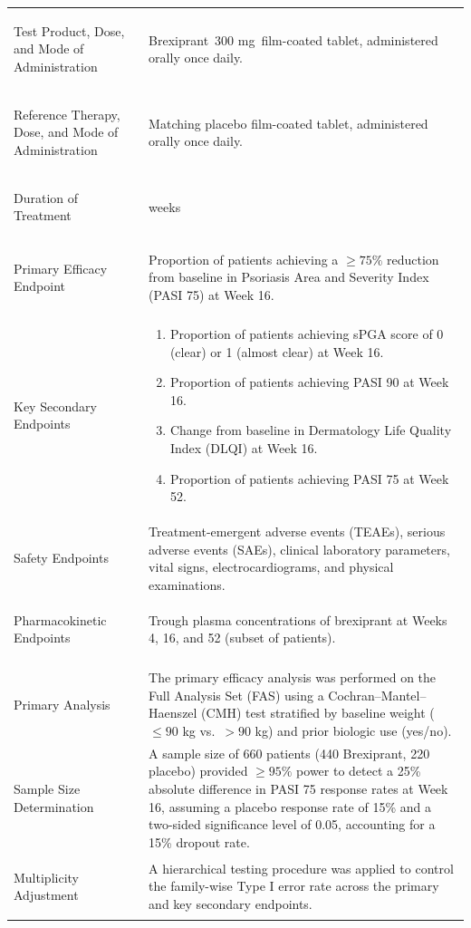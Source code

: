 \documentclass[11pt, a4paper]{article}
\newcommand{\studydrug}{Brexiprant}
\newcommand{\studydose}{300 mg}
\begin{document}
\begin{tabularx}{\linewidth}{@{}>{\color{accent}\bfseries\raggedright}p{38mm}@{\hspace{6mm}}>{\raggedright\arraybackslash}X@{}}
Test Product, Dose, and Mode of Administration & \studydrug\ \studydose\ film-coated tablet, administered orally once daily. \\
Reference Therapy, Dose, and Mode of Administration & Matching placebo film-coated tablet, administered orally once daily. \\
Duration of Treatment    & 52 weeks \\
\midrule
\multicolumn{2}{@{}l}{\textbf{\large\color{accent}Evaluation Criteria}}\\
\midrule
Primary Efficacy Endpoint & Proportion of patients achieving a $\ge 75\%$ reduction from baseline in Psoriasis Area and Severity Index (PASI 75) at Week 16. \\
Key Secondary Endpoints  & \begin{enumerate}[nosep, leftmargin=*]
  \item Proportion of patients achieving sPGA score of 0 (clear) or 1 (almost clear) at Week 16.
  \item Proportion of patients achieving PASI 90 at Week 16.
  \item Change from baseline in Dermatology Life Quality Index (DLQI) at Week 16.
  \item Proportion of patients achieving PASI 75 at Week 52.
\end{enumerate} \\
Safety Endpoints         & Treatment-emergent adverse events (TEAEs), serious adverse events (SAEs), clinical laboratory parameters, vital signs, electrocardiograms, and physical examinations. \\
Pharmacokinetic Endpoints & Trough plasma concentrations of brexiprant at Weeks 4, 16, and 52 (subset of patients). \\
\midrule
\multicolumn{2}{@{}l}{\textbf{\large\color{accent}Statistical Methods}}\\
\midrule
Primary Analysis         & The primary efficacy analysis was performed on the Full Analysis Set (FAS) using a Cochran--Mantel--Haenszel (CMH) test stratified by baseline weight ($\le 90$ kg vs.\ $> 90$ kg) and prior biologic use (yes/no). \\
Sample Size Determination & A sample size of 660 patients (440 \studydrug, 220 placebo) provided $\ge 95\%$ power to detect a 25\% absolute difference in PASI 75 response rates at Week 16, assuming a placebo response rate of 15\% and a two-sided significance level of 0.05, accounting for a 15\% dropout rate. \\
Multiplicity Adjustment   & A hierarchical testing procedure was applied to control the family-wise Type I error rate across the primary and key secondary endpoints. \\

\end{tabularx}
\end{document}

